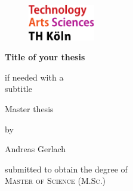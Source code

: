 
\begin{titlepage}

\begin{center}

\begin{figure}[!ht]
		\includegraphics[width=0.26\textwidth]{images/THlogoheader.pdf}
\end{figure}

\vspace{0.8cm}

\begin{rmfamily}
\begin{huge}
\textbf{Title of your thesis}\\	
\end{huge}
\vspace{0.5cm}
\begin{LARGE}
if needed with a \\subtitle\\
\end{LARGE}
\end{rmfamily}

\vspace{1.6cm}


\begin{LARGE}
\begin{scshape}
Master thesis\\[0.8em]
\end{scshape}
\end{LARGE}

\begin{large}
by\\ 
\vspace{0.2cm}
\begin{LARGE}
Andreas Gerlach\\
\end{LARGE}
\end{large}

\vspace{1.0cm}

\begin{large}
submitted to obtain the degree of\\
\vspace{0.4cm}
\textsc{Master of Science (M.Sc.)}\\ 
\end{large}


\end{center}
\end{titlepage}
